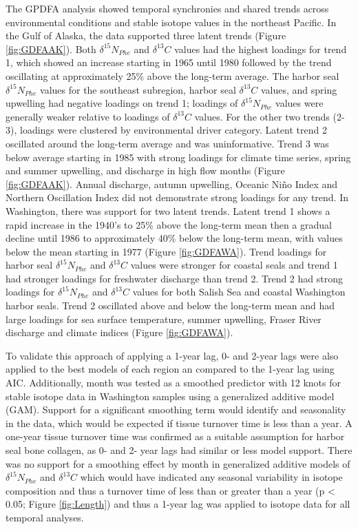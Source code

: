 \documentclass [11pt, proquest] {uwthesis}[2015/03/03]
\begin{document}
The GPDFA analysis showed temporal synchronies and shared trends across
environmental conditions and stable isotope values in the northeast
Pacific. In the Gulf of Alaska, the data supported three latent trends
(Figure \ref{fig:GDFAAK}). Both \(\delta^{15}N_{Phe}\) and
\(\delta^{13}C\) values had the highest loadings for trend 1, which
showed an increase starting in 1965 until 1980 followed by the trend
oscillating at approximately 25\% above the long-term average. The
harbor seal \(\delta^{15}N_{Phe}\) values for the southeast subregion,
harbor seal \(\delta^{13}C\) values, and spring upwelling had negative
loadings on trend 1; loadings of \(\delta^{15}N_{Phe}\) values were
generally weaker relative to loadings of \(\delta^{13}C\) values. For
the other two trends (2-3), loadings were clustered by environmental
driver category. Latent trend 2 oscillated around the long-term average
and was uninformative. Trend 3 was below average starting in 1985 with
strong loadings for climate time series, spring and summer upwelling,
and discharge in high flow months (Figure \ref{fig:GDFAAK}). Annual
discharge, autumn upwelling, Oceanic Niño Index and Northern Oscillation
Index did not demonstrate strong loadings for any trend. In Washington,
there was support for two latent trends. Latent trend 1 shows a rapid
increase in the 1940's to 25\% above the long-term mean then a gradual
decline until 1986 to approximately 40\% below the long-term mean, with
values below the mean starting in 1977 (Figure \ref{fig:GDFAWA}). Trend
loadings for harbor seal \(\delta^{15}N_{Phe}\) and \(\delta^{13}C\)
values were stronger for coastal seals and trend 1 had stronger loadings
for freshwater discharge than trend 2. Trend 2 had strong loadings for
\(\delta^{15}N_{Phe}\) and \(\delta^{13}C\) values for both Salish Sea
and coastal Washington harbor seals. Trend 2 oscillated above and below
the long-term mean and had large loadings for sea surface temperature,
summer upwelling, Fraser River discharge and climate indices (Figure
\ref{fig:GDFAWA}).

To validate this approach of applying a 1-year lag, 0- and 2-year lags
were also applied to the best models of each region an compared to the
1-year lag using AIC. Additionally, month was tested as a smoothed
predictor with 12 knots for stable isotope data in Washington samples
using a generalized additive model (GAM). Support for a significant
smoothing term would identify and seasonality in the data, which would
be expected if tissue turnover time is less than a year. A one-year
tissue turnover time was confirmed as a suitable assumption for harbor
seal bone collagen, as 0- and 2- year lags had similar or less model
support. There was no support for a smoothing effect by month in
generalized additive models of \(\delta^{15}N_{Phe}\) and
\(\delta^{13}C\) which would have indicated any seasonal variability in
isotope composition and thus a turnover time of less than or greater
than a year (p \textless{} 0.05; Figure \ref{fig:Length}) and thus a
1-year lag was applied to isotope data for all temporal analyses.
\end{document}
